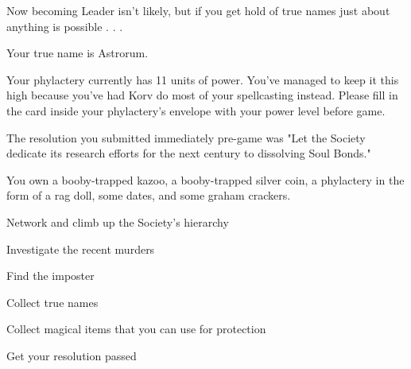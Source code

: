 \documentclass[char]{Sel}
\begin{document}
Now becoming Leader isn't likely, but if you get hold of true names just about anything is possible . . .

\begin{itemz}[Notes]
  \item Your true name is Astrorum.
      \item Your phylactery currently has 11 units of power. You've managed to keep it this high because you've had Korv do most of your spellcasting instead. Please fill in the card inside your phylactery's envelope with your power level before game.
  \item The resolution you submitted immediately pre-game was "Let the Society dedicate its research efforts for the next century to dissolving Soul Bonds."
  \item You own a booby-trapped kazoo, a booby-trapped silver coin, a phylactery in the form of a rag doll, some dates, and some graham crackers.
    \end{itemz}
    
  
    
 \begin{itemz}[Goals]
 \item Network and climb up the Society's hierarchy
\item Investigate the recent murders
\item Find the imposter
\item Collect true names
\item Collect magical items that you can use for protection
\item Get your resolution passed
\end{itemz}
\end{document}
